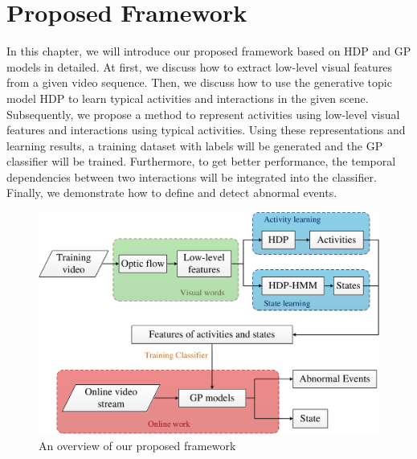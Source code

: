 \chapter{Proposed Framework}
\label{chap:framework}
In this chapter, we will introduce our proposed framework based on HDP and GP models in detailed. At first, we discuss how to extract low-level visual features from a given video sequence. Then, we discuss how to use the generative topic model HDP to learn typical activities and interactions in the given scene. Subsequently, we propose a method to represent activities using low-level visual features and interactions using typical activities. Using these representations and learning results, a training dataset with labels will be generated and the GP classifier will be trained. Furthermore, to get better performance, the temporal dependencies between two interactions will be integrated into the classifier. Finally, we demonstrate how to define and detect abnormal events.

\begin{figure}[!htbp]
	\centering
	\includegraphics[width = 15cm]{figures/framework-crop.pdf}
	\caption[An overview of our proposed framework]{An overview of our proposed framework}
	\label{fig:framework}
\end{figure}

